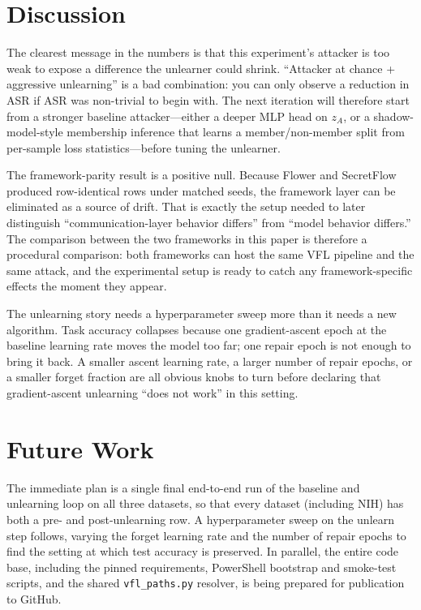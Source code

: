 \documentclass[letterpaper,twocolumn,10pt]{article}
\begin{document}
\section{Discussion}

The clearest message in the numbers is that this experiment's attacker
is too weak to expose a difference the unlearner could shrink.
``Attacker at chance + aggressive unlearning'' is a bad combination:
you can only observe a reduction in ASR if ASR was non-trivial to begin
with. The next iteration will therefore start from a stronger baseline
attacker---either a deeper MLP head on $z_A$, or a shadow-model-style
membership inference that learns a member/non-member split from
per-sample loss statistics---before tuning the unlearner.

The framework-parity result is a positive null. Because Flower and
SecretFlow produced row-identical rows under matched seeds, the
framework layer can be eliminated as a source of drift. That is
exactly the setup needed to later distinguish ``communication-layer
behavior differs'' from ``model behavior differs.'' The comparison
between the two frameworks in this paper is therefore a procedural
comparison: both frameworks can host the same VFL pipeline and the
same attack, and the experimental setup is ready to catch any
framework-specific effects the moment they appear.

The unlearning story needs a hyperparameter sweep more than it needs a
new algorithm. Task accuracy collapses because one gradient-ascent
epoch at the baseline learning rate moves the model too far; one
repair epoch is not enough to bring it back. A smaller ascent
learning rate, a larger number of repair epochs, or a smaller forget
fraction are all obvious knobs to turn before declaring that
gradient-ascent unlearning ``does not work'' in this setting.

\section{Future Work}

The immediate plan is a single final end-to-end run of the baseline and
unlearning loop on all three datasets, so that every dataset (including
NIH) has both a pre- and post-unlearning row. A hyperparameter sweep on
the unlearn step follows, varying the forget learning rate and the
number of repair epochs to find the setting at which test accuracy is
preserved. In parallel, the entire code base, including the pinned
requirements, PowerShell bootstrap and smoke-test scripts, and the
shared \texttt{vfl\_paths.py} resolver, is being prepared for
publication to GitHub.
\end{document}
